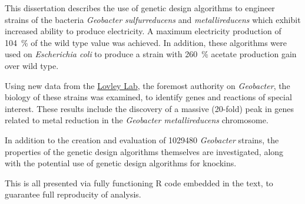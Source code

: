 This dissertation describes the use of genetic design algorithms to engineer strains of the bacteria \textit{Geobacter sulfurreducens} and \textit{metallireducens} which exhibit increased ability to produce electricity. 
A maximum electricity production of \SI{104}{\percent} of the wild type value was achieved.
In addition, these algorithms were used on \textit{Escherichia coli} to produce a strain with \SI{260}{\percent} acetate production gain over wild type.

Using new data from the \href{http://www.geobacter.org/}{Lovley Lab}, the foremost authority on \textit{Geobacter}, the biology of these strains was examined, to identify genes and reactions of special interest. These results include the discovery of a massive (20-fold) peak in genes related to metal reduction in the \textit{Geobacter metallireducens} chromosome.

In addition to the creation and evaluation of \num{1029480} \textit{Geobacter} strains, the properties of the genetic design algorithms themselves are investigated, along with the potential use of genetic design algorithms for knockins.

This is all presented via fully functioning R code embedded in the text, to guarantee full reproducity of analysis. 